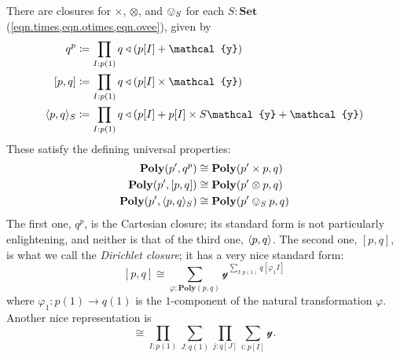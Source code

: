 \documentclass[11pt, one side, article]{memoir}
\theoremstyle{definition}
\theoremstyle{plain}
\DeclarePairedDelimiter{\present}{\langle}{\rangle}
\newcommand{\Cat}[1]{\mathbf{#1}}%
\newcommand{\smset}{\Cat{Set}}
\newcommand{\yon}{{\mathcal{y}}}
\newcommand{\poly}{\Cat{Poly}}
\newcommand{\0}{\textsf{0}}
\newcommand{\1}{\tn{\textsf{1}}}
\newcommand{\tri}{\mathbin{\triangleleft}}
\begin{document}
There are closures for $\times$, $\otimes$, and $\ovee_S$ for each $S:\smset$ (\cref{eqn.times,eqn.otimes,eqn.ovee}),%
given by
\begin{align}
  q^p&\coloneqq \prod_{I: p(1)}q\tri(p[I]+\yon)\label{eqn.cart_cl}\\
  [p,q]&\coloneqq\prod_{I: p(1)}q\tri(p[I]\times\yon)\\
  \present{p,q}_S&\coloneqq\prod_{I: p(1)}q\tri(p[I]+p[I]\times S\yon+\yon)
\end{align}
These satisfy the defining universal properties:
\begin{align}
  \poly(p',q^p)&\cong\poly(p'\times p,q)\\
  \poly(p',[p,q])&\cong\poly(p'\otimes p,q)\\
  \poly(p',\present{p,q}_S)&\cong\poly(p'\ovee_S p,q)
\end{align}
The first one, $q^p$, is the Cartesian closure; its standard form is not particularly enlightening, and neither is that of the third one, $\present{p,q}$. The second one, $[p,q]$, is what we call the \emph{Dirichlet closure}; it has a very nice standard form:
\begin{equation}\label{eqn.dirichlet_hom_standard}
[p,q]\cong\sum_{\varphi:\poly(p,q)}\yon^{\sum\limits_{I: p(1)}q[\varphi_1I]}
\end{equation}
where $\varphi_1\colon p(1)\to q(1)$ is the $1$-component of the natural transformation $\varphi$. Another nice representation is
\begin{equation}
[p,q]\cong\prod_{I: p(1)}\sum_{J: q(1)}\prod_{j: q[J]}\sum_{i: p[I]}\yon.
\end{equation}
\end{document}

